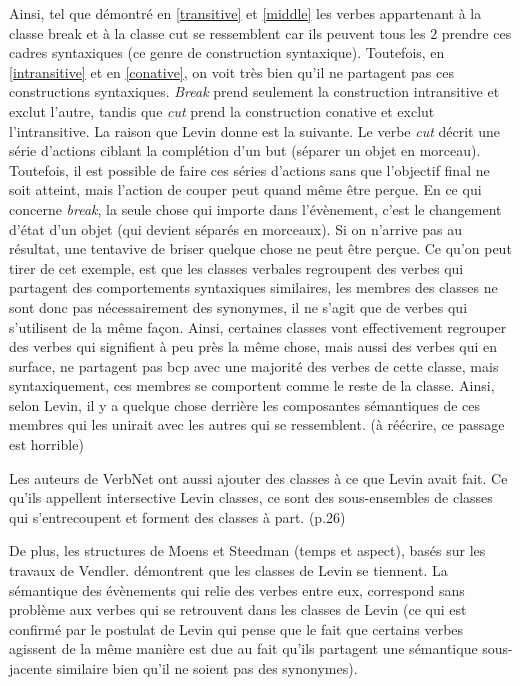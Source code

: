 \documentclass[12pt,maitrise,frenchb,natbib,twoside,initial]{dms}
\numberwithin{equation}{section}
\numberwithin{table}{chapter}
\numberwithin{figure}{chapter}
\begin{document}
Ainsi, tel que démontré en \ref{transitive} et \ref{middle} les verbes appartenant à la classe break et à la classe cut se ressemblent car ils peuvent tous les 2 prendre ces cadres syntaxiques (ce genre de construction syntaxique). Toutefois, en \ref{intransitive} et en \ref{conative}, on voit très bien qu'il ne partagent pas ces constructions syntaxiques. \emph{Break} prend seulement la construction intransitive et exclut l'autre, tandis que \emph{cut} prend la construction conative et exclut l'intransitive. La raison que Levin donne est la suivante. Le verbe \emph{cut} décrit une série d'actions ciblant la complétion d'un but (séparer un objet en morceau). Toutefois, il est possible de faire ces séries d'actions sans que l'objectif final ne soit atteint, mais l'action de couper peut quand même être perçue. En ce qui concerne \emph{break}, la seule chose qui importe dans l'évènement, c'est le changement d'état d'un objet (qui devient séparés en morceaux). Si on n'arrive pas au résultat, une tentavive de briser quelque chose ne peut être perçue. Ce qu'on peut tirer de cet exemple, est que les classes verbales regroupent des verbes qui partagent des comportements syntaxiques similaires, les membres des classes ne sont donc pas nécessairement des synonymes, il ne s'agit que de verbes qui s'utilisent de la même façon. Ainsi, certaines classes vont effectivement regrouper des verbes qui signifient à peu près la même chose, mais aussi des verbes qui en surface, ne partagent pas bcp avec une majorité des verbes de cette classe, mais syntaxiquement, ces membres se comportent comme le reste de la classe. Ainsi, selon Levin, il y a quelque chose derrière les composantes sémantiques de ces membres qui les unirait avec les autres qui se ressemblent. (à réécrire, ce passage est horrible)

Les auteurs de VerbNet ont aussi ajouter des classes à ce que Levin avait fait. Ce qu'ils appellent intersective Levin classes, ce sont des sous-ensembles de classes qui s'entrecoupent et forment des classes à part. (p.26)

De plus, les structures de Moens et  Steedman (temps et aspect), basés sur les travaux de Vendler. démontrent que les classes de Levin se tiennent. La sémantique des évènements qui relie des verbes entre eux, correspond sans problème aux verbes qui se retrouvent dans les classes de Levin (ce qui est confirmé par le postulat de Levin qui pense que le fait que certains verbes agissent de la même manière est due au fait qu'ils partagent une sémantique sous-jacente similaire bien qu'il ne soient pas des synonymes).
\end{document}
